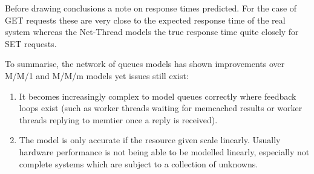                Before drawing conclusions a note on response times predicted. For the case of GET requests these are
                very close to the expected response time of the real system whereas the Net-Thread models the true
                response time quite closely for SET requests. 

                To summarise, the network of queues models has shown improvements over M/M/1 and M/M/m models yet issues
                still exist:
                \begin{enumerate}
                    \item It becomes increasingly complex to model queues correctly where feedback loops exist (such as
                          worker threads waiting for memcached results or worker threads replying to memtier once a
                          reply is received).
                    \item The model is only accurate if the resource given scale linearly. Usually hardware performance
                          is not being able to be modelled linearly, especially not complete systems which are subject
                          to a collection of unknowns.
                \end{enumerate}
